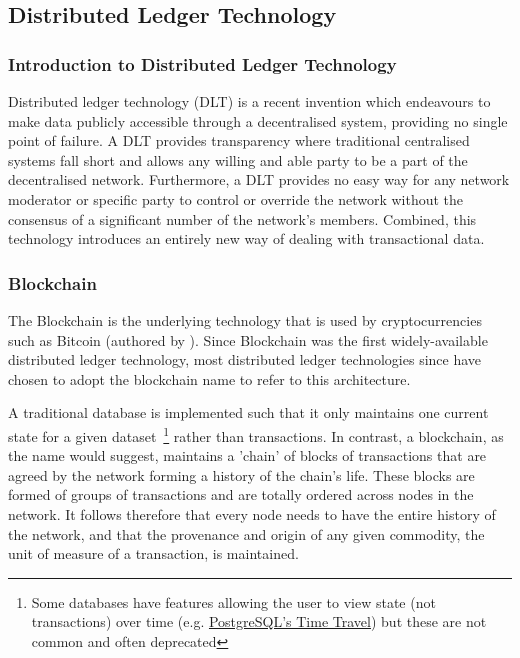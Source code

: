 \subsection{Distributed Ledger Technology}

\subsubsection{Introduction to Distributed Ledger Technology}

Distributed ledger technology (DLT) is a recent invention which endeavours to make data publicly accessible through a decentralised system, providing no single point of failure. A DLT provides transparency where traditional centralised systems fall short and allows any willing and able party to be a part of the decentralised network. Furthermore, a DLT provides no easy way for any network moderator or specific party to control or override the network without the consensus of a significant number of the network's members. Combined, this technology introduces an entirely new way of dealing with transactional data.

\subsubsection{Blockchain}

The Blockchain is the underlying technology that is used by cryptocurrencies such as Bitcoin (authored by \cite{bitcoin:2008:misc}). Since Blockchain was the first widely-available distributed ledger technology, most distributed ledger technologies since have chosen to adopt the blockchain name to refer to this architecture.

A traditional database is implemented such that it only maintains one current state for a given dataset~\footnote{Some databases have features allowing the user to view state (not transactions) over time (e.g. \href{https://www.postgresql.org/docs/6.3/static/c0503.htm}{PostgreSQL's Time Travel}) but these are not common and often deprecated} rather than transactions. In contrast, a blockchain, as the name would suggest, maintains a 'chain' of blocks of transactions that are agreed by the network forming a history of the chain's life. These blocks are formed of groups of transactions and are totally ordered across nodes in the network. It follows therefore that every node needs to have the entire history of the network, and that the provenance and origin of any given commodity, the unit of measure of a transaction, is maintained.

